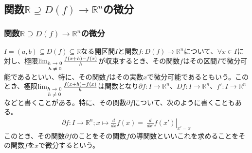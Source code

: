 \documentclass[dvipdfmx]{jsarticle}
\begin{document}
\subsection{関数$\mathbb{R}\supseteq D(f)\rightarrow \mathbb{R}^{n} $の微分}%
\subsubsection{関数$\mathbb{R}\supseteq D(f)\rightarrow \mathbb{R}^{n} $の微分}%
\begin{dfn}
$I = (a,b) \subseteq D(f) \subseteq \mathbb{R}$なる開区間$I$と関数$f:D(f) \rightarrow \mathbb{R}^{n}$について、$\forall x \in I$に対し、極限$\lim_{\scriptsize \begin{matrix}
h \rightarrow 0 \\
h \neq 0 \\
\end{matrix}}\frac{f(x + h) - f(x)}{h}$が収束するとき、その関数$f$はその区間$I$で微分可能であるといい、特に、その関数$f$はその実数$x$で微分可能であるともいう。このとき、極限$\lim_{\scriptsize \begin{matrix}
h \rightarrow 0 \\
h \neq 0 \\
\end{matrix}}\frac{f(x + h) - f(x)}{h}$は関数となり$\partial f:I \rightarrow \mathbb{R}^{n}$、$Df:I \rightarrow \mathbb{R}^{n}$、$f':I \rightarrow \mathbb{R}^{n}$などと書くことがある。特に、その関数$\partial f$について、次のように書くこともある。
\begin{align*}
\partial f:I \rightarrow \mathbb{R}^{n};x \mapsto \frac{d}{dx}f(x) = \left. \ \frac{d}{dx'}f\left( x' \right) \right|_{x' = x}
\end{align*}
このとき、その関数$\partial f$のことをその関数$f$の導関数といいこれを求めることをその関数$f$を$x$で微分するという。
\end{dfn}
\end{document}
